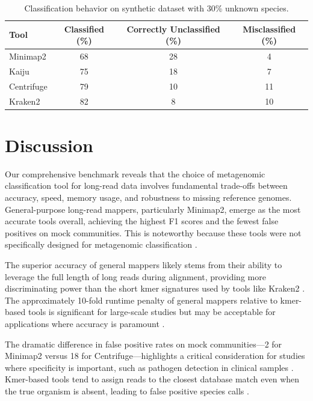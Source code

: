 \documentclass[11pt]{article}
\begin{document}
\begin{table}[ht]
\centering
\caption{Classification behavior on synthetic dataset with 30\% unknown species.}
\label{tab:unknown}
\begin{tabular}{@{}lccc@{}}
\toprule
Tool & Classified (\%) & Correctly Unclassified (\%) & Misclassified (\%) \\
\midrule
Minimap2 & 68 & 28 & 4 \\
Kaiju & 75 & 18 & 7 \\
Centrifuge & 79 & 10 & 11 \\
Kraken2 & 82 & 8 & 10 \\
\bottomrule
\end{tabular}
\end{table}

\section{Discussion}

Our comprehensive benchmark reveals that the choice of metagenomic classification tool for long-read data involves fundamental trade-offs between accuracy, speed, memory usage, and robustness to missing reference genomes. General-purpose long-read mappers, particularly Minimap2, emerge as the most accurate tools overall, achieving the highest F1 scores and the fewest false positives on mock communities. This is noteworthy because these tools were not specifically designed for metagenomic classification \citep{li2018minimap2}.

The superior accuracy of general mappers likely stems from their ability to leverage the full length of long reads during alignment, providing more discriminating power than the short kmer signatures used by tools like Kraken2 \citep{wood2019improved}. The approximately 10-fold runtime penalty of general mappers relative to kmer-based tools is significant for large-scale studies but may be acceptable for applications where accuracy is paramount \citep{rang2018squiggle}.

The dramatic difference in false positive rates on mock communities---2 for Minimap2 versus 18 for Centrifuge---highlights a critical consideration for studies where specificity is important, such as pathogen detection in clinical samples \citep{chiu2019clinical}. Kmer-based tools tend to assign reads to the closest database match even when the true organism is absent, leading to false positive species calls \citep{breitwieser2019review}.
\end{document}
